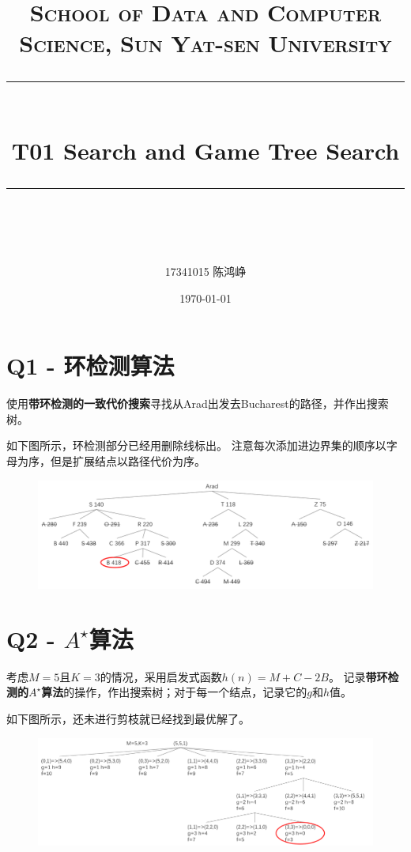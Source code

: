 \documentclass[a4paper, 11pt]{article}
\title{	
\normalfont \normalsize
\textsc{School of Data and Computer Science, Sun Yat-sen University} \\ [25pt] %
\rule{\textwidth}{0.5pt} \\[0.4cm] %
\huge  T01 Search and Game Tree Search\\ %
\rule{\textwidth}{2pt} \\[0.5cm] %
\author{17341015 陈鸿峥}
\date{\normalsize\today}
}
\begin{document}
\maketitle
\tableofcontents
\newpage

\section{Q1 - 环检测算法}
\begin{question}
使用\textbf{带环检测的一致代价搜索}寻找从Arad出发去Bucharest的路径，并作出搜索树。
\end{question}
\begin{answer}
如下图所示，环检测部分已经用删除线标出。
注意每次添加进边界集的顺序以字母为序，但是扩展结点以路径代价为序。
\begin{figure}[H]
\centering
\includegraphics[width=\linewidth]{fig/A1.png}
\end{figure}
\end{answer}

\section{Q2 - $A^\star$算法}
\begin{question}[传教士与野人问题]
考虑$M=5$且$K=3$的情况，采用启发式函数$h(n)=M+C-2B$。
记录\textbf{带环检测的$A^\star$算法}的操作，作出搜索树；对于每一个结点，记录它的$g$和$h$值。
\end{question}
\begin{answer}
如下图所示，还未进行剪枝就已经找到最优解了。
\begin{figure}[H]
\centering
\includegraphics[width=\linewidth]{fig/A2.png}
\end{figure}
\end{answer}
\end{document}

